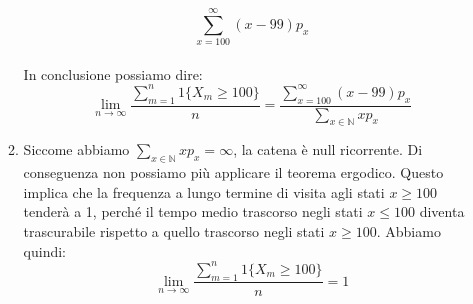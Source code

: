 \documentclass[a4paper,12pt]{article}
\begin{document}
\begin{itemize}
\begin{enumerate}[label=\alph*)]
			\[
			\sum_{x=100}^{\infty} (x - 99) p_x
			\]\\
			In conclusione possiamo dire:\\
			\[
			\lim_{n \to \infty} \frac{\sum_{m=1}^n 1\{X_m \geq 100\}}{n} = \frac{\sum_{x=100}^{\infty} (x - 99) p_x}{\sum_{x \in \mathbb{N}} x p_x}
			\]
			\item Siccome abbiamo \( \sum_{x \in \mathbb{N}} x p_x = \infty \), la catena è null ricorrente. Di conseguenza non possiamo più applicare il teorema ergodico. Questo implica che la frequenza a lungo termine di visita agli stati $x \geq 100$ tenderà a 1, perché il tempo medio trascorso negli stati $x \leq 100$ diventa trascurabile rispetto a quello trascorso negli stati $x \geq 100$. Abbiamo quindi:\\
			 \[
			 \lim_{n \to \infty} \frac{\sum_{m=1}^n 1\{X_m \geq 100\}}{n} = 1
			 \]
			
			
			
		\end{enumerate}
	
	\end{itemize}
	
\end{document}
